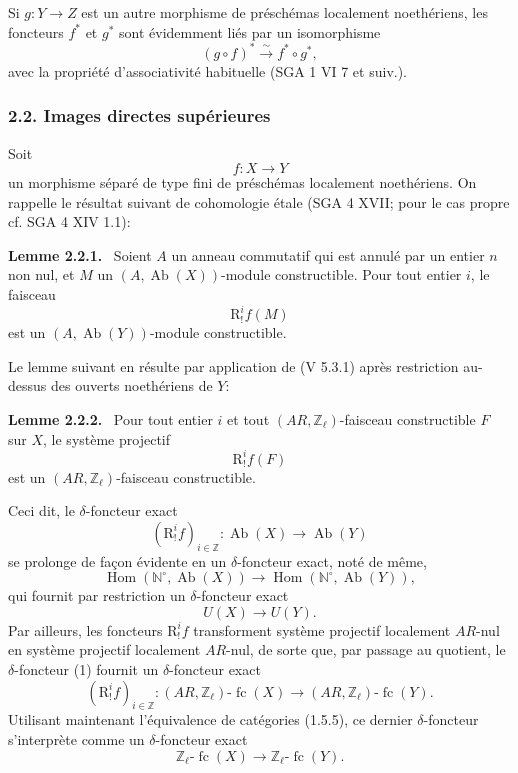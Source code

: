 \documentclass[11pt]{article}
\newenvironment{statement}[1]{\par\medskip\noindent\textbf{#1.}\ }{\par\medskip}
\DeclareMathOperator{\Hom}{Hom}
\newcommand{\R}{\mathrm{R}}\newcommand{\RHomCore}{\mathrm{RHom}}
\providecommand{\Hom}{\operatorname{Hom}}
\providecommand{\Ab}{\operatorname{Ab}}
\providecommand{\fc}{\operatorname{fc}}
\providecommand{\R}{\mathrm R}
\providecommand{\Ab}{\operatorname{Ab}}
\providecommand{\Hom}{\operatorname{Hom}}
\begin{document}
Si \(g:Y\to Z\) est un autre morphisme de préschémas localement noethériens, les foncteurs \(f^*\) et \(g^*\) sont évidemment liés par un isomorphisme
\[
(g\circ f)^*\xrightarrow{\sim}f^*\circ g^*,
\]
avec la propriété d'associativité habituelle (SGA 1 VI 7 et suiv.).

\subsubsection*{2.2. Images directes supérieures}

Soit
\[
f:X\longrightarrow Y
\]
un morphisme séparé de type fini de préschémas localement noethériens. On rappelle le résultat suivant de cohomologie étale (SGA 4 XVII; pour le cas propre cf. SGA 4 XIV 1.1):

\begin{statement}{Lemme 2.2.1}
Soient \(A\) un anneau commutatif qui est annulé par un entier \(n\) non nul, et \(M\) un \((A,\Ab(X))\)-module constructible. Pour tout entier \(i\), le faisceau
\[
\R^i_!f(M)
\]
est un \((A,\Ab(Y))\)-module constructible.
\end{statement}

Le lemme suivant en résulte par application de (V 5.3.1) après restriction au-dessus des ouverts noethériens de \(Y\):

\begin{statement}{Lemme 2.2.2}
Pour tout entier \(i\) et tout \((AR,\mathbb Z_\ell)\)-faisceau constructible \(F\) sur \(X\), le système projectif
\[
\R^i_!f(F)
\]
est un \((AR,\mathbb Z_\ell)\)-faisceau constructible.
\end{statement}

Ceci dit, le \(\delta\)-foncteur exact
\[
(\R^i_!f)_{i\in\mathbb Z}:\Ab(X)\longrightarrow \Ab(Y)
\]
se prolonge de façon évidente en un \(\delta\)-foncteur exact, noté de même,
\[
\Hom(\mathbb N^\circ,\Ab(X))\longrightarrow \Hom(\mathbb N^\circ,\Ab(Y)),
\]
qui fournit par restriction un \(\delta\)-foncteur exact
\[
U(X)\longrightarrow U(Y).
\tag{1}
\]
Par ailleurs, les foncteurs \(\R^i_!f\) transforment système projectif localement \(AR\)-nul en système projectif localement \(AR\)-nul, de sorte que, par passage au quotient, le \(\delta\)-foncteur (1) fournit un \(\delta\)-foncteur exact%
\[
(\R^i_!f)_{i\in\mathbb Z}:(AR,\mathbb Z_\ell)\text{-}\fc(X)
\longrightarrow (AR,\mathbb Z_\ell)\text{-}\fc(Y).
\]
Utilisant maintenant l'équivalence de catégories (1.5.5), ce dernier \(\delta\)-foncteur s'interprète comme un \(\delta\)-foncteur exact
\[
\mathbb Z_\ell\text{-}\fc(X)\longrightarrow \mathbb Z_\ell\text{-}\fc(Y).
\]
\end{document}
